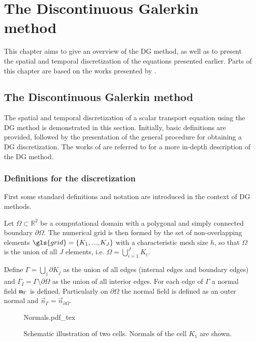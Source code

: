 \chapter{The Discontinuous Galerkin method}	\label{ch:NumericalMethods}
This chapter aims to give an overview of the DG method, as well as to present the spatial and temporal discretization of the equations presented earlier.  Parts of this chapter are based on the works presented by \textcite{kummerExtendedDiscontinuousGalerkin2017,kikkerFullyCoupledHighorder, smudamartinDirectNumericalSimulation2021}.

\section{The Discontinuous Galerkin method}
The spatial and temporal discretization of a scalar transport equation using the DG method is demonstrated in this section. Initially, basic definitions are provided, followed by the presentation of the general procedure for obtaining a DG discretization. The works of \textcite{cockburnDevelopmentDiscontinuousGalerkin2000,hesthavenNodalDiscontinuousGalerkin2008,dipietroMathematicalAspectsDiscontinuous2012} are referred to for a more in-depth description of the DG method.
\subsection{Definitions for the discretization} \label{ssec:SpatDiscretization}
First some standard definitions and notation are introduced in the context of DG methods. 

Let $\Omega \subset \mathbb{R}^2$ be a computational domain with a polygonal and simply connected boundary $\partial \Omega$. The numerical grid is then formed by the set of non-overlapping elements $\gls{grid} = \{K_1, ..., K_J\}$ with a characteristic mesh size $h$, so that $\Omega$ is the union of all $J$ elements, i.e. $\Omega = \bigcup_{i=1}^J K_i$. 

Define $\Gamma = \bigcup_j \partial K_j$ as the union of all edges (internal edges and boundary edges) and $\Gamma_I = \Gamma \setminus \partial \Omega$ as the union of all interior edges.
For each edge of $\Gamma$ a normal field $\textbf{n}_{\Gamma}$ is defined. Particularly on $\partial \Omega$ the normal field is defined as an outer normal and $\vec{n}_\Gamma = \vec{n}_{\partial\Omega}$.
\begin{figure}[h]
	\begin{center}
		\def\svgwidth{0.5\textwidth}
		{Normals.pdf_tex}
		\caption{Schematic illustration of two cells. Normals of the cell $K_1$ are shown. }
		\label{fig:TwoCells}
	\end{center}
\end{figure}

